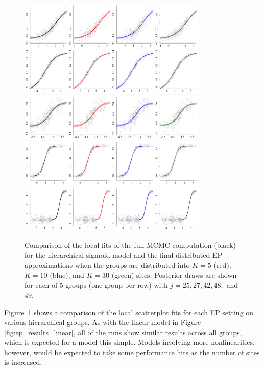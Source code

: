 \begin{figure}
\centering
    \includegraphics[width=0.8\textwidth]{figures/ep_sim/sigmoid_fit_1.png}
     \includegraphics[width=0.8\textwidth]{figures/ep_sim/sigmoid_fit_2.png}
     \includegraphics[width=0.8\textwidth]{figures/ep_sim/sigmoid_fit_3.png}
     \includegraphics[width=0.8\textwidth]{figures/ep_sim/sigmoid_fit_4.png}
     \includegraphics[width=0.8\textwidth]{figures/ep_sim/sigmoid_fit_5.png}
\caption{Comparison of the local fits of the full MCMC computation (black) for the hierarchical sigmoid model and the final distributed EP approximations when the groups are distributed into $K=5$ (red), $K=10$ (blue), and $K=30$ (green) sites. Posterior draws are shown for each of 5 groups (one group per row) with $j = 25, 27, 42, 48,$ and $49$.}
\label{fig:ep_results_sigmoid}
\end{figure}

Figure~\ref{fig:ep_results_sigmoid} shows a comparison of the local scatterplot fits for each EP setting on various hierarchical groups. As with the linear model in Figure \ref{fig:ep_results_linear}, all of the runs show similar results across all groups, which is expected for a model this simple. Models involving more nonlinearities, however, would be expected to take some performance hits as the number of sites is increased.

